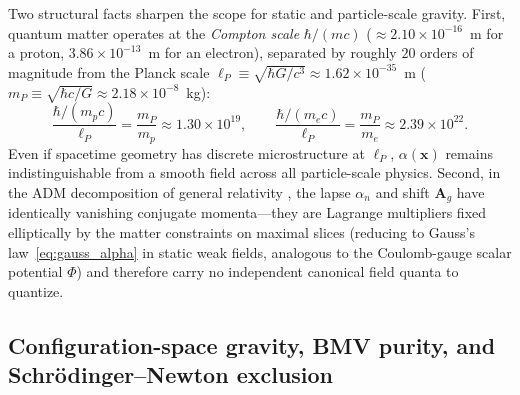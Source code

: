 \documentclass[aps,prd,onecolumn,tightenlines,nofootinbib,notitlepage,10pt,floatfix]{revtex4-2}
\theoremstyle{indentedtheorem}
\begin{document}
Two structural facts sharpen the scope for static and particle-scale gravity. First, quantum matter operates at the \emph{Compton scale} $\hbar/(mc)$ ($\approx 2.10\times 10^{-16}$~m for a proton, $3.86\times 10^{-13}$~m for an electron), separated by roughly $20$ orders of magnitude from the Planck scale $\ell_P\equiv\sqrt{\hbar G/c^3}\approx 1.62\times 10^{-35}$~m ($m_P\equiv\sqrt{\hbar c/G}\approx 2.18\times 10^{-8}$~kg):
\begin{equation}
    \frac{\hbar/(m_p c)}{\ell_P} = \frac{m_P}{m_p} \approx 1.30\times 10^{19} , \qquad \frac{\hbar/(m_e c)}{\ell_P} = \frac{m_P}{m_e} \approx 2.39\times 10^{22} .
    \label{eq:compton_planck_ratio}
\end{equation}
Even if spacetime geometry has discrete microstructure at $\ell_P$, $\alpha(\mathbf{x})$ remains indistinguishable from a smooth field across all particle-scale physics. Second, in the ADM decomposition of general relativity \citep{Arnowitt2008Dynamics,DeWitt1967Quantum,Gourgoulhon2007Formalism}, the lapse $\alpha_n$ and shift $\mathbf{A}_g$ have identically vanishing conjugate momenta---they are Lagrange multipliers fixed elliptically by the matter constraints on maximal slices (reducing to Gauss's law~\eqref{eq:gauss_alpha} in static weak fields, analogous to the Coulomb-gauge scalar potential $\Phi$) and therefore carry no independent canonical field quanta to quantize.

\subsection{Configuration-space gravity, BMV purity, and Schr\"odinger--Newton exclusion}
\label{sec:fields_gravity}
\end{document}
